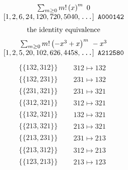 \allowdisplaybreaks
\begin{tiny}
$$
\begin{matrix}
\sum_{m \geq 0} m! \left(
x
\right)^m
\ 
0
\\
\left[1, 2, 6, 24, 120, 720, 5040, \text{\texttt{...}}\right]
\ 
\texttt{A000142}
\end{matrix}
$$
\vspace{-1em}
\begin{align}
\textnormal{the identity equivalence}
\end{align}
$$
\begin{matrix}
\sum_{m \geq 0} m! \left(
-x^{3} + x
\right)^m
\ 
-x^{3}
\\
\left[1, 2, 5, 20, 102, 626, 4458, \text{\texttt{...}}\right]
\ 
\texttt{A212580}
\end{matrix}
$$
\vspace{-1em}
\begin{align}
\{\{132, 312\}\}
\quad
&
\begin{matrix}
312 \mapsto 132
\end{matrix}
\\
\{\{132, 231\}\}
\quad
&
\begin{matrix}
231 \mapsto 132
\end{matrix}
\\
\{\{231, 321\}\}
\quad
&
\begin{matrix}
231 \mapsto 321
\end{matrix}
\\
\{\{312, 321\}\}
\quad
&
\begin{matrix}
312 \mapsto 321
\end{matrix}
\\
\{\{132, 321\}\}
\quad
&
\begin{matrix}
132 \mapsto 321
\end{matrix}
\\
\{\{213, 321\}\}
\quad
&
\begin{matrix}
213 \mapsto 321
\end{matrix}
\\
\{\{213, 231\}\}
\quad
&
\begin{matrix}
231 \mapsto 213
\end{matrix}
\\
\{\{213, 312\}\}
\quad
&
\begin{matrix}
312 \mapsto 213
\end{matrix}
\\
\{\{123, 213\}\}
\quad
&
\begin{matrix}
213 \mapsto 123
\end{matrix}

\end{align}
\end{tiny}
